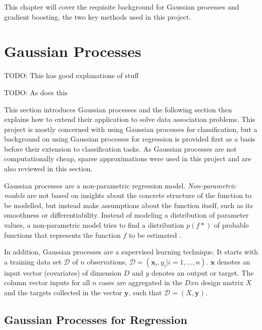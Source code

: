 \documentclass[12pt,a4paper]{report}
\theoremstyle{definition}
\begin{document}
This chapter will cover the requisite background for Gaussian processes and gradient boosting, the two key methods used in this project.

\section{Gaussian Processes}

\citep{Yi2019} TODO: This has good explanations of stuff

\citep{Griffiths2023} TODO: As does this

This section introduces Gaussian processes and the following section then explains how to extend their application to solve data association problems. 
This project is mostly concerned with using Gaussian processes for classification, but a background on using Gaussian processes for regression is provided first as a basis before their extension to classification tasks. 
As Gaussian processes are not computationally cheap, sparse approximations were used in this project and are also reviewed in this section.

Gaussian processes are a non-parametric regression model. 
\emph{Non-parametric models} are not based on insights about the concrete structure of the function to be modelled, but instead make assumptions about the function itself, such as its smoothness or differentiability. 
Instead of modeling a distribution of parameter values, a non-parametric model tries to find a distribution $p(f*)$ of probable functions that represents the function $f$ to be estimated \citep{Kaiser2017}.

In addition, Gaussian processes are a supervised learning technique. 
It starts with a training data set $\mathcal{D}$ of $n$ observations, $\mathcal{D} = (\textbf{x}_{i}, y_{i} | i = 1, ..., n)$.
$\textbf{x}$ denotes an input vector (covariates) of dimension $D$ and $y$ denotes an output or target. 
The column vector inputs for all $n$ cases are aggregated in the $D x n$ design matrix $X$ and the targets collected in the vector $\textbf{y}$, such that $\mathcal{D} = (X, \textbf{y})$.

\subsection{Gaussian Processes for Regression}

\end{document}
